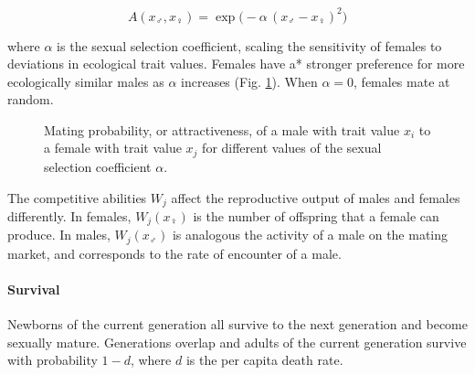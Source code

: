 \begin{equation}
    A(x_{\male}, x_{\female}) = \exp{\big(-\alpha \, (x_{\male} - x_{\female})^2\big)}
    \label{eq:assortative_mating}
\end{equation}

where $\alpha$ is the sexual selection coefficient, scaling the sensitivity of females to deviations in ecological trait values. Females have a* stronger preference for more ecologically similar males as $\alpha$ increases (Fig. \ref{fig:mating_probability}). When $\alpha = 0$, females mate at random.\\ 

\begin{figure}
    \begin{center}
        \end{center}
    \label{fig:mating_probability}
    \caption{Mating probability, or attractiveness, of a male with trait value $x_i$ to a female with trait value $x_j$ for different values of the sexual selection coefficient $\alpha$.}
\end{figure}

The competitive abilities $W_j$ affect the reproductive output of males and females differently. In females, $W_j(x_{\female})$ is the number of offspring that a female can produce. In males, $W_j(x_{\male})$ is analogous the activity of a male on the mating market, and corresponds to the rate of encounter of a male.

\paragraph{Survival} Newborns of the current generation all survive to the next generation and become sexually mature. Generations overlap and adults of the current generation survive with probability $1-d$, where $d$ is the per capita death rate.

